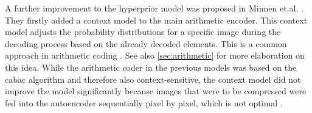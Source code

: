 A further improvement to the hyperprior model was proposed in Minnen et.al. \citep{minnen_joint_2018}. They firstly added a context model to the main arithmetic encoder. This context model adjusts the probability distributions for a specific image during the decoding process based on the already decoded elements. This is a common approach in arithmetic coding \citep{said_introduction_2023}. See also \autoref{sec:arithmetic} for more elaboration on this idea. While the arithmetic coder in the previous models was based on the \ac{cabac} algorithm and therefore also context-sensitive, the context model did not improve the model significantly because images that were to be compressed were fed into the autoencoder sequentially pixel by pixel, which is not optimal \citep{balle_end--end_2017}.
